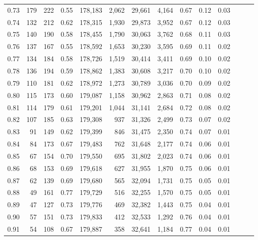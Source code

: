 \begin{tabular}{rrrrrrrrrrrrrr}
0.73 &    179 &  222 &  0.55 &  178,183 &    2,062 &  29,661 &   4,164 &  0.67 &  0.12 &      0.03 \\
0.74 &    132 &  212 &  0.62 &  178,315 &    1,930 &  29,873 &   3,952 &  0.67 &  0.12 &      0.03 \\
0.75 &    140 &  190 &  0.58 &  178,455 &    1,790 &  30,063 &   3,762 &  0.68 &  0.11 &      0.03 \\
0.76 &    137 &  167 &  0.55 &  178,592 &    1,653 &  30,230 &   3,595 &  0.69 &  0.11 &      0.02 \\
0.77 &    134 &  184 &  0.58 &  178,726 &    1,519 &  30,414 &   3,411 &  0.69 &  0.10 &      0.02 \\
0.78 &    136 &  194 &  0.59 &  178,862 &    1,383 &  30,608 &   3,217 &  0.70 &  0.10 &      0.02 \\
0.79 &    110 &  181 &  0.62 &  178,972 &    1,273 &  30,789 &   3,036 &  0.70 &  0.09 &      0.02 \\
0.80 &    115 &  173 &  0.60 &  179,087 &    1,158 &  30,962 &   2,863 &  0.71 &  0.08 &      0.02 \\
0.81 &    114 &  179 &  0.61 &  179,201 &    1,044 &  31,141 &   2,684 &  0.72 &  0.08 &      0.02 \\
0.82 &    107 &  185 &  0.63 &  179,308 &      937 &  31,326 &   2,499 &  0.73 &  0.07 &      0.02 \\
0.83 &     91 &  149 &  0.62 &  179,399 &      846 &  31,475 &   2,350 &  0.74 &  0.07 &      0.01 \\
0.84 &     84 &  173 &  0.67 &  179,483 &      762 &  31,648 &   2,177 &  0.74 &  0.06 &      0.01 \\
0.85 &     67 &  154 &  0.70 &  179,550 &      695 &  31,802 &   2,023 &  0.74 &  0.06 &      0.01 \\
0.86 &     68 &  153 &  0.69 &  179,618 &      627 &  31,955 &   1,870 &  0.75 &  0.06 &      0.01 \\
0.87 &     62 &  139 &  0.69 &  179,680 &      565 &  32,094 &   1,731 &  0.75 &  0.05 &      0.01 \\
0.88 &     49 &  161 &  0.77 &  179,729 &      516 &  32,255 &   1,570 &  0.75 &  0.05 &      0.01 \\
0.89 &     47 &  127 &  0.73 &  179,776 &      469 &  32,382 &   1,443 &  0.75 &  0.04 &      0.01 \\
0.90 &     57 &  151 &  0.73 &  179,833 &      412 &  32,533 &   1,292 &  0.76 &  0.04 &      0.01 \\
0.91 &     54 &  108 &  0.67 &  179,887 &      358 &  32,641 &   1,184 &  0.77 &  0.04 &      0.01 \\

\end{tabular}
